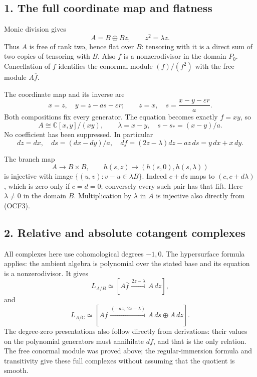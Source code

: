 \documentclass[
]{article}
\begin{document}
\subsection{1. The full coordinate map and
flatness}\label{the-full-coordinate-map-and-flatness}

Monic division gives \[
A=B\oplus Bz,\qquad z^2=\lambda z.
\tag{OCF3}
\] Thus \(A\) is free of rank two, hence flat over \(B\): tensoring with
it is a direct sum of two copies of tensoring with \(B\). Also \(f\) is
a nonzerodivisor in the domain \(P_0\). Cancellation of \(f\) identifies
the conormal module \((f)/(f^2)\) with the free module \(A\overline f\).

The coordinate map and its inverse are \[
x=z,\quad y=z-as-\varepsilon r;
\qquad z=x,\quad s=\frac{x-y-\varepsilon r}{a}.
\tag{OCF4}
\] Both compositions fix every generator. The equation becomes exactly
\(f=xy\), so \[
A\cong\mathbb C[x,y]/(xy),\qquad
\lambda=x-y,\quad s-s_*=(x-y)/a.
\tag{OCF5}
\] No coefficient has been suppressed. In particular \[
dz=dx,\quad ds=(dx-dy)/a,\quad
df=(2z-\lambda)dz-az\,ds=y\,dx+x\,dy.
\tag{OCF6}
\]

The branch map \[
A\longrightarrow B\times B,\qquad
h(s,z)\longmapsto(h(s,0),h(s,\lambda))
\tag{OCF7}
\] is injective with image \(\{(u,v):v-u\in\lambda B\}\). Indeed
\(c+dz\) maps to \((c,c+d\lambda)\), which is zero only if \(c=d=0\);
conversely every such pair has that lift. Here \(\lambda\ne0\) in the
domain \(B\). Multiplication by \(\lambda\) in \(A\) is injective also
directly from (OCF3).

\subsection{2. Relative and absolute cotangent
complexes}\label{relative-and-absolute-cotangent-complexes}

All complexes here use cohomological degrees \(-1,0\). The hypersurface
formula applies: the ambient algebra is polynomial over the stated base
and its equation is a nonzerodivisor. It gives \[
L_{A/B}\simeq
[A\overline f\xrightarrow{\,2z-\lambda\,}A\,dz],
\tag{OCF8}
\] and \[
L_{A/\mathbb C}\simeq
[A\overline f\xrightarrow{\,(-az,\;2z-\lambda)\,}
 A\,ds\oplus A\,dz].
\tag{OCF9}
\] The degree-zero presentations also follow directly from derivations:
their values on the polynomial generators must annihilate \(df\), and
that is the only relation. The free conormal module was proved above;
the regular-immersion formula and transitivity give these full complexes
without assuming that the quotient is smooth.
\end{document}
